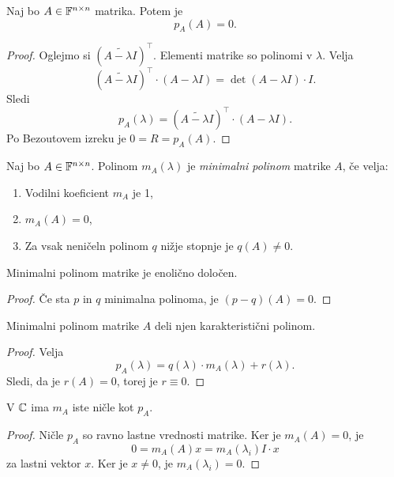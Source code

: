 \documentclass[12pt, a4paper]{article}
\begin{document}
\begin{izrek}
Naj bo $A\in\mathbb{F}^{n\times n}$ matrika. Potem je
\[
p_A(A)=0.
\]
\end{izrek}

\begin{proof}
Oglejmo si $\left(\widetilde{A-\lambda I}\right)^\top$. Elementi matrike so polinomi v $\lambda$. Velja
\[
\left(\widetilde{A-\lambda I}\right)^\top\cdot (A-\lambda I)=\det(A-\lambda I)\cdot I.
\]
Sledi
\[
p_A(\lambda)=\left(\widetilde{A-\lambda I}\right)^\top\cdot(A-\lambda I).
\]
Po Bezoutovem izreku je $0=R=p_A(A)$.
\end{proof}

\begin{definicija}
Naj bo $A\in\mathbb{F}^{n\times n}$. Polinom $m_A(\lambda)$ je \emph{minimalni polinom} matrike $A$, če velja:

\begin{enumerate}[label=\roman*)]
\item Vodilni koeficient $m_A$ je 1,
\item $m_A(A)=0$,
\item Za vsak neničeln polinom $q$ nižje stopnje je $q(A)\ne 0$.
\end{enumerate}
\end{definicija}

\begin{izrek}
Minimalni polinom matrike je enolično določen.
\end{izrek}

\begin{proof}
Če sta $p$ in $q$ minimalna polinoma, je $(p-q)(A)=0$.
\end{proof}

\begin{trditev}
Minimalni polinom matrike $A$ deli njen karakteristični polinom.
\end{trditev}

\begin{proof}
Velja
\[
p_A(\lambda)=q(\lambda)\cdot m_A(\lambda)+r(\lambda).
\]
Sledi, da je $r(A)=0$, torej je $r\equiv 0$.
\end{proof}

\begin{izrek}
V $\mathbb{C}$ ima $m_A$ iste ničle kot $p_A$.
\end{izrek}

\begin{proof}
Ničle $p_A$ so ravno lastne vrednosti matrike. Ker je $m_A(A)=0$, je
\[
0=m_A(A)x=m_A(\lambda_i)I\cdot x
\]
za lastni vektor $x$. Ker je $x\ne 0$, je $m_A(\lambda_i)=0$.
\end{proof}
\end{document}
